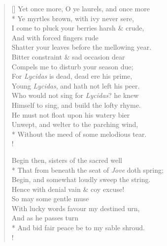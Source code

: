 \documentclass[MAIN]{subfiles}
\begin{document}
\settowidth{\versewidth}{Yet once more, O ye laurels, and once more}
\begin{verse}[\versewidth]
Yet once more, O ye laurels, and once more\\*
Ye myrtles brown, with ivy never sere,\\
I come to pluck your berries harsh \& crude,\\
And with forced fingers rude\\
Shatter your leaves before the mellowing year.\\
Bitter constraint \& sad occasion dear\\
Compels me to disturb your season due;\\
For \emph{Lycidas} is dead, dead ere his prime,\\
Young \emph{Lycidas}, and hath not left his peer.\\
Who would not sing for \emph{Lycidas}? he knew\\
Himself to sing, and build the lofty rhyme.\\
He must not float upon his watery bier\\
Unwept, and welter to the parching wind,\\*
Without the meed of some melodious tear.\\!

Begin then, sisters of the sacred well\\*
That from beneath the seat of \emph{Jove} doth spring;\\
Begin, and somewhat loudly sweep the string.\\
Hence with denial vain \& coy excuse!\\
So may some gentle muse\\
With lucky words favour my destined urn,\\
And as he passes turn\\*
And bid fair peace be to my sable shroud.\\!


\end{verse}
\end{document}
